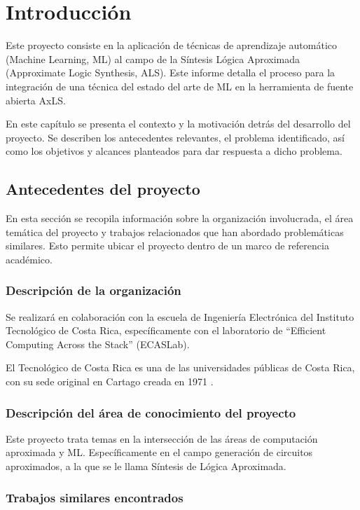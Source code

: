 \chapter{Introducción}

Este proyecto consiste en la aplicación de técnicas de aprendizaje automático
(Machine Learning, ML) al campo de la Síntesis Lógica Aproximada (Approximate
Logic Synthesis, ALS).
Este informe detalla el proceso para la integración de una técnica del estado del
arte de ML en la herramienta de fuente abierta AxLS.

En este capítulo se presenta el contexto y la motivación detrás del desarrollo del
proyecto. Se describen los antecedentes relevantes, el problema identificado,
así como los objetivos y alcances planteados para dar respuesta a dicho
problema.

\section{Antecedentes del proyecto}

En esta sección se recopila información sobre la organización
involucrada, el área temática del proyecto y trabajos relacionados que han
abordado problemáticas similares. Esto permite ubicar el proyecto dentro de un
marco de referencia académico.

\subsection{Descripción de la organización}

Se realizará en colaboración con la escuela de Ingeniería Electrónica del
Instituto Tecnológico de Costa Rica, específicamente con el laboratorio de
``Efficient Computing Across the Stack'' (ECASLab).

El Tecnológico de Costa Rica es una de las universidades públicas de Costa
Rica, con su sede original en Cartago creada en 1971 \cite{resena_tec}.

\subsection{Descripción del área de conocimiento del proyecto}

Este proyecto trata temas en la intersección de las áreas de computación
aproximada y ML.
Específicamente en el campo generación de circuitos aproximados, a la
que se le llama Síntesis de Lógica Aproximada.

\subsection{Trabajos similares encontrados}
\label{sec:trabajos_similares}

